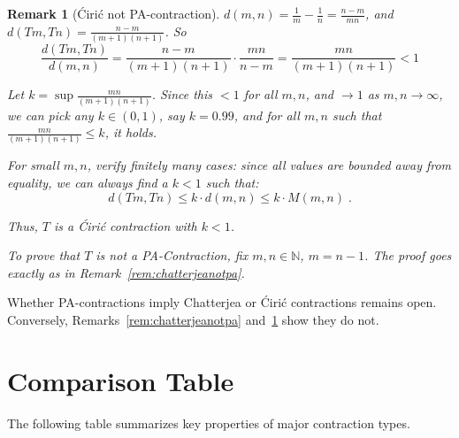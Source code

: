 \documentclass[11pt]{article}
\newtheorem{remark}[theorem]{Remark}
\begin{document}
\begin{remark}[\'Ciri\'c not PA-contraction]
$ d(m,n) = \frac{1}{m} - \frac{1}{n} = \frac{n - m}{mn} $,
and $ d(Tm,Tn) = \frac{n - m}{(m+1)(n+1)} $.
So
\begin{equation}
\frac{d(Tm,Tn)}{d(m,n)} = \frac{n - m}{(m+1)(n+1)} \cdot \frac{mn}{n - m} = \frac{mn}{(m+1)(n+1)} < 1
\end{equation}


Let $ k = \sup \frac{mn}{(m+1)(n+1)} $. Since this $ < 1 $ for all $ m,n $, and $ \to 1 $ as $ m,n \to \infty $, we can pick any $ k \in (0,1) $, say $ k = 0.99 $, and for all $ m,n $ such that $ \frac{mn}{(m+1)(n+1)} \leq k $, it holds.

For small $ m,n $, verify finitely many cases: since all values are bounded away from equality, we can always find a $ k < 1 $ such that:
\begin{equation}
d(Tm,Tn) \leq k \cdot d(m,n) \leq k \cdot M(m,n) \; .
\end{equation}

Thus, $ T $ is a \'Ciri\'c contraction with $ k < 1 $.


To prove that $ T $ is not a PA-Contraction, fix  $ m, n \in \mathbb{N} $,
 $ m = n - 1 $. The proof goes exactly as in Remark~\ref{rem:chatterjeanotpa}.


\label{rem:ciricnotpa}
\end{remark}

Whether PA-contractions imply Chatterjea or \'Ciri\'c contractions remains open. Conversely, Remarks~\ref{rem:chatterjeanotpa} and~\ref{rem:ciricnotpa} show they do not.

\section{Comparison Table}

The following table summarizes key properties of major contraction types.

\begin{center}
\end{center}
\end{document}
